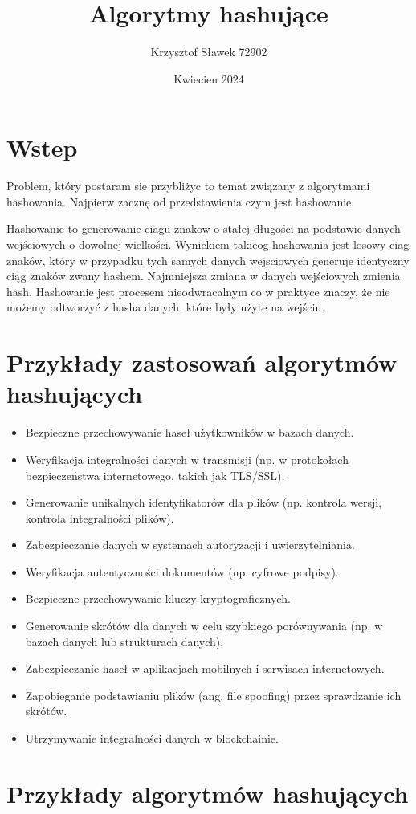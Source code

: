 \documentclass{article}
\title{Algorytmy hashujące}
\author{Krzysztof Sławek 72902}
\date{Kwiecien 2024}
\begin{document}
\maketitle

\section{Wstep}

Problem, który postaram sie przybliżyc to temat związany z algorytmami hashowania.
Najpierw zacznę od przedstawienia czym jest hashowanie.

Hashowanie to generowanie ciagu znakow o stałej długości na podstawie danych wejściowych o dowolnej wielkości. Wyniekiem takieog hashowania jest losowy ciag znaków, który w przypadku tych samych danych wejsciowych generuje identyczny ciąg znaków zwany hashem. Najmniejsza zmiana w danych wejściowych zmienia hash. 
Hashowanie jest procesem nieodwracalnym co w praktyce znaczy, że nie możemy odtworzyć z hasha danych, które były użyte na wejściu.

\section{Przykłady zastosowań algorytmów hashujących}

\begin{itemize}
    \item Bezpieczne przechowywanie haseł użytkowników w bazach danych.
    \item Weryfikacja integralności danych w transmisji 
    (np. w protokołach bezpieczeństwa internetowego, takich jak TLS/SSL).
    \item Generowanie unikalnych identyfikatorów dla plików (np. kontrola wersji, kontrola integralności plików).
    \item Zabezpieczanie danych w systemach autoryzacji i uwierzytelniania.
    \item Weryfikacja autentyczności dokumentów (np. cyfrowe podpisy).
    \item Bezpieczne przechowywanie kluczy kryptograficznych.
    \item Generowanie skrótów dla danych w celu szybkiego porównywania (np. w bazach danych lub strukturach danych).
    \item Zabezpieczanie haseł w aplikacjach mobilnych i serwisach internetowych.
    \item Zapobieganie podstawianiu plików (ang. file spoofing) przez sprawdzanie ich skrótów.
    \item Utrzymywanie integralności danych w blockchainie.
\end{itemize}

\section{Przykłady algorytmów hashujących}
\end{document}
